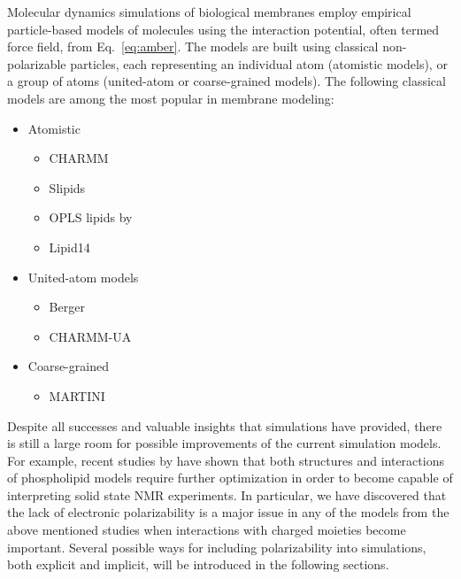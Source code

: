 Molecular dynamics simulations of biological membranes employ empirical particle-based models of molecules
using the interaction potential, often termed force field, from Eq.~\ref{eq:amber}. 
The models are built using classical non-polarizable particles, 
each representing an individual atom (atomistic models), 
or a group of atoms (united-atom or coarse-grained models). 
The following classical models are among the most popular in membrane modeling:
\begin{itemize}
 \item Atomistic
 \begin{itemize}
   \item CHARMM \citep{klauda10}
   \item Slipids \citep{jambeck12, jambeck12b}
   \item OPLS lipids by \citet{maciejewski14}
   \item Lipid14 \citep{dickson14}
  \end{itemize}

 \item United-atom models
  \begin{itemize}
   \item Berger \citep{Berger97}
   \item CHARMM-UA \citep{lee14}
  \end{itemize}
 \item Coarse-grained
 \begin{itemize}
   \item MARTINI \citep{marrink07}
  \end{itemize}
\end{itemize}

Despite all successes and valuable insights that simulations have provided, 
there is still a large room for possible improvements of the current simulation models. 
For example, recent studies by \citet{botan15, catte16} have shown 
that both structures and interactions of phospholipid models require further optimization 
in order to become capable of interpreting solid state NMR experiments. 
In particular, we have discovered that 
the lack of electronic polarizability is a major issue in any of the models 
from the above mentioned studies %
when interactions with charged moieties become important. \citep{melcr18}
Several possible ways for including polarizability into simulations, both explicit and implicit, 
will be introduced in the following sections. 





